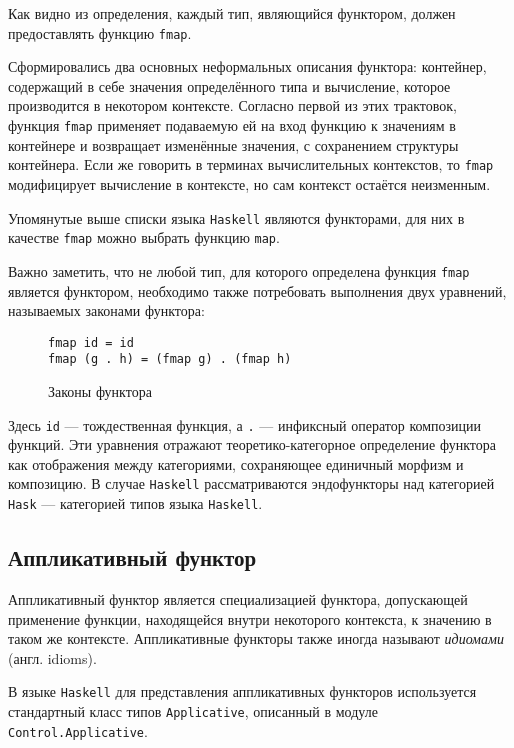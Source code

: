 Как видно из определения, каждый тип, являющийся функтором, должен предоставлять
функцию \lstinline{fmap}.

Сформировались два основных неформальных описания функтора: контейнер, 
содержащий в себе значения определённого типа и вычисление, которое производится
в некотором контексте. Согласно первой из этих трактовок, функция 
\lstinline{fmap} применяет подаваемую ей на вход функцию к значениям в 
контейнере и возвращает изменённые значения, с сохранением структуры контейнера.
Если же говорить в терминах вычислительных контекстов, то \lstinline{fmap}
модифицирует вычисление в контексте, но сам контекст остаётся неизменным.

Упомянутые выше списки языка \lstinline{Haskell} являются функторами, для них в
качестве \lstinline{fmap} можно выбрать функцию \lstinline{map}.

Важно заметить, что не любой тип, для которого определена функция 
\lstinline{fmap} является функтором, необходимо также потребовать выполнения 
двух уравнений, называемых законами функтора:

\begin{figure}[h]
\begin{lstlisting}
fmap id = id
fmap (g . h) = (fmap g) . (fmap h)
\end{lstlisting}
\caption{Законы функтора}
\label{listing:FunctorLaws}
\end{figure}

Здесь \lstinline{id} --- тождественная функция, а \lstinline{.} --- инфиксный
оператор композиции функций. Эти уравнения отражают теоретико-категорное 
определение функтора как отображения между категориями, сохраняющее единичный 
морфизм и композицию. В случае \lstinline{Haskell} рассматриваются эндофункторы 
над категорией \lstinline{Hask} --- категорией типов языка \lstinline{Haskell}.

\subsection{Аппликативный функтор}

Аппликативный функтор является специализацией функтора, допускающей применение 
функции, находящейся внутри некоторого контекста, к значению в таком же 
контексте. Аппликативные функторы также иногда называют \emph{идиомами} 
(англ. idioms).

В языке \lstinline{Haskell} для представления аппликативных функторов 
используется стандартный класс типов \lstinline{Applicative}, 
описанный в модуле \lstinline{Control.Applicative}.

